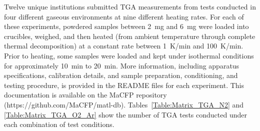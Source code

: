 \documentclass{book}
\begin{document}
Twelve unique institutions submitted TGA measurements from tests conducted in four different gaseous environments at nine different heating rates. For each of these experiments, powdered samples between 2~mg and 6~mg were loaded into crucibles, weighed, and then heated (from ambient temperature through complete thermal decomposition) at a constant rate between 1~K/min and 100~K/min. Prior to heating, some samples were loaded and kept under isothermal conditions for approximately 10~min to 20~min. More information, including  apparatus specifications, calibration details, and sample preparation, conditioning, and testing procedure, is provided in the README files for each experiment. This documentation is available on the MaCFP repository (https://github.com/MaCFP/matl-db). Tables~\ref{Table:Matrix_TGA_N2} and \ref{Table:Matrix_TGA_O2_Ar} show the number of TGA tests conducted under each combination of test conditions.
\end{document}
